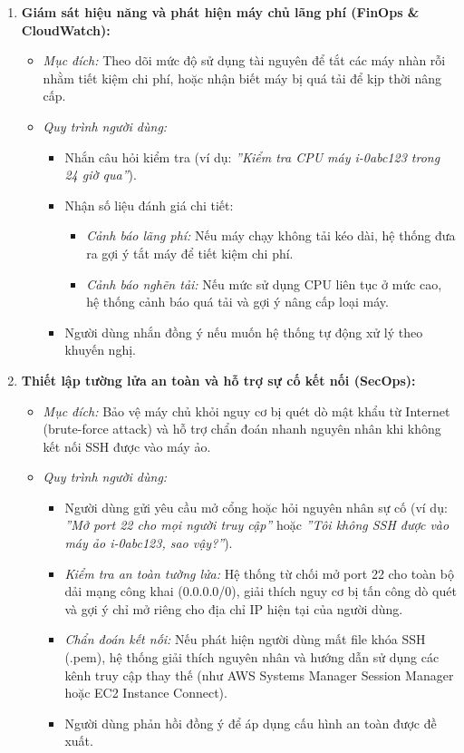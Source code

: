 \documentclass[a4paper,12pt]{article}
\begin{document}
\begin{enumerate}
  \item \textbf{Giám sát hiệu năng và phát hiện máy chủ lãng phí (FinOps \& CloudWatch):}
  \begin{itemize}
    \item \textit{Mục đích:} Theo dõi mức độ sử dụng tài nguyên để tắt các máy nhàn rỗi nhằm tiết kiệm chi phí, hoặc nhận biết máy bị quá tải để kịp thời nâng cấp.
    \item \textit{Quy trình người dùng:}
    \begin{itemize}
      \item Nhắn câu hỏi kiểm tra (ví dụ: \textit{''Kiểm tra CPU máy i-0abc123 trong 24 giờ qua''}).
      \item Nhận số liệu đánh giá chi tiết:
      \begin{itemize}
        \item \textit{Cảnh báo lãng phí:} Nếu máy chạy không tải kéo dài, hệ thống đưa ra gợi ý tắt máy để tiết kiệm chi phí.
        \item \textit{Cảnh báo nghẽn tải:} Nếu mức sử dụng CPU liên tục ở mức cao, hệ thống cảnh báo quá tải và gợi ý nâng cấp loại máy.
      \end{itemize}
      \item Người dùng nhắn đồng ý nếu muốn hệ thống tự động xử lý theo khuyến nghị.
    \end{itemize}
  \end{itemize}

  \item \textbf{Thiết lập tường lửa an toàn và hỗ trợ sự cố kết nối (SecOps):}
  \begin{itemize}
    \item \textit{Mục đích:} Bảo vệ máy chủ khỏi nguy cơ bị quét dò mật khẩu từ Internet (brute-force attack) và hỗ trợ chẩn đoán nhanh nguyên nhân khi không kết nối SSH được vào máy ảo.
    \item \textit{Quy trình người dùng:}
    \begin{itemize}
      \item Người dùng gửi yêu cầu mở cổng hoặc hỏi nguyên nhân sự cố (ví dụ: \textit{''Mở port 22 cho mọi người truy cập''} hoặc \textit{''Tôi không SSH được vào máy ảo i-0abc123, sao vậy?''}).
      \item \textit{Kiểm tra an toàn tường lửa:} Hệ thống từ chối mở port 22 cho toàn bộ dải mạng công khai (0.0.0.0/0), giải thích nguy cơ bị tấn công dò quét và gợi ý chỉ mở riêng cho địa chỉ IP hiện tại của người dùng.
      \item \textit{Chẩn đoán kết nối:} Nếu phát hiện người dùng mất file khóa SSH (.pem), hệ thống giải thích nguyên nhân và hướng dẫn sử dụng các kênh truy cập thay thế (như AWS Systems Manager Session Manager hoặc EC2 Instance Connect).
      \item Người dùng phản hồi đồng ý để áp dụng cấu hình an toàn được đề xuất.
    \end{itemize}
  \end{itemize}
\end{enumerate}
\end{document}
